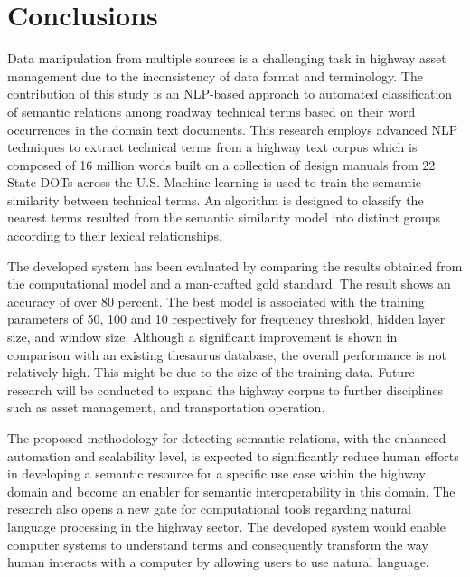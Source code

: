 \documentclass[Journal, BackFigs, DoubleSpace]{ascelike}%
\begin{document}
\section{Conclusions} \label{sec:conclns3} 
Data manipulation from multiple sources is a challenging task in highway asset management due to the inconsistency of data format and terminology. The contribution of this study is an NLP-based approach to automated classification of semantic relations among roadway technical terms based on their word occurrences in the domain text documents. This research employs advanced NLP techniques to extract technical terms from a highway text corpus which is composed of 16 million words built on a collection of design manuals from 22 State DOTs across the U.S. Machine learning is used to train the semantic similarity between technical terms. An algorithm is designed to classify the nearest terms resulted from the semantic similarity model into distinct groups according to their lexical relationships. 
\par
The developed system has been evaluated by comparing the results obtained from the computational model and a man-crafted gold standard. The result shows an accuracy of over 80 percent. The best model is associated with the training parameters of 50, 100 and 10 respectively for frequency threshold, hidden layer size, and window size. Although a significant improvement is shown in comparison with an existing thesaurus database, the overall performance is not relatively high. This might be due to the size of the training data. Future research will be conducted to expand the highway corpus to further disciplines such as asset management, and transportation operation. 
\par
The proposed methodology for detecting semantic relations, with the enhanced automation and scalability level, is expected to significantly reduce human efforts in developing a semantic resource for a specific use case within the highway domain and become an enabler for semantic interoperability in this domain. The research also opens a new gate for computational tools regarding natural language processing in the highway sector. The developed system would enable computer systems to understand terms and consequently transform the way human interacts with a computer by allowing users to use natural language.


%
%
\end{document}
